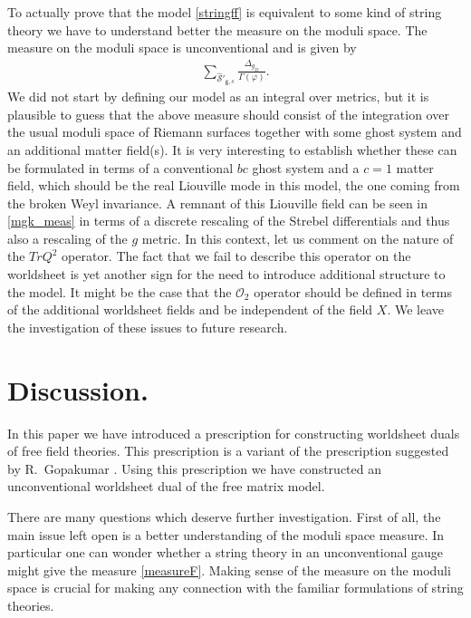 \documentclass[11pt]{JHEP3}
\def\be{\begin{eqnarray}}
\def\ee{\end{eqnarray}}
\def\vf{\varphi}
\def\gg{\mathsf g }
\begin{document}
To actually prove that the model \eqref{stringff} is equivalent to some kind of string theory
we have to understand better the measure on the moduli space.
The measure on the moduli space is unconventional and is given by
\be\label{measureF}
\sum_{\hat{\mathcal S}'_{\gg,s}}\frac{\Delta_{g_D}}{\Gamma(\vf)}.
\ee We did not start by defining our model as an integral over metrics, but it is plausible to guess that the above measure
should consist of the integration over the usual moduli space of Riemann
surfaces together with some ghost system and an additional matter field(s). It is very interesting to establish whether these
can be formulated in terms of a conventional $bc$ ghost system and a $c=1$ matter field, which  should be the real Liouville mode 
in this model, the one coming from the broken Weyl invariance. A remnant
of this Liouville field can be seen in \eqref{mgk_meas} in terms of a discrete rescaling of the Strebel differentials and thus also
a rescaling of the $g$ metric. In this context, let us comment on the nature of the $TrQ^2$ operator. The fact that we fail
to describe this operator on the worldsheet is yet another sign for the need to
introduce additional structure to the model. It might be the case that the ${\mathcal O}_2$
operator should be defined in terms of the additional worldsheet fields and be independent of the field $X$.
 We leave the investigation of these issues to future research.


\section{Discussion.}\label{4d}

In this paper we have introduced a prescription for constructing
worldsheet duals of free field theories. This prescription is a variant
of the prescription suggested by R.~Gopakumar \cite{Gopakumar3}. 
Using this prescription we have constructed an unconventional worldsheet dual of the free matrix model. 

There are many questions which deserve further investigation.
First of all, the main issue left open is a 
better understanding of the moduli space measure. In particular one can wonder
whether a string theory in an unconventional gauge might give the measure \eqref{measureF}.
Making sense of the measure on the moduli space is crucial for making any 
connection with the familiar formulations of string theories.
\end{document}
